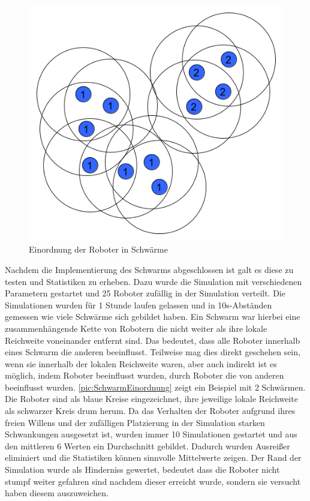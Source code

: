 \begin{figure}
	\includegraphics[width=\pictureWidth,keepaspectratio]{graphics/SchwarmEinordnung.png}
	\caption{Einordnung der Roboter in Schwärme}
	\label{pic:SchwarmEinordnung}
\end{figure}

Nachdem die Implementierung des Schwarms abgeschlossen ist galt es diese zu testen und Statistiken zu erheben. Dazu wurde die Simulation mit verschiedenen Parametern gestartet und 25 Roboter zufällig in der Simulation verteilt. Die Simulationen wurden für 1 Stunde laufen gelassen und in 10s-Abständen gemessen wie viele Schwärme sich gebildet haben.
Ein Schwarm war hierbei eine zusammenhängende Kette von Robotern die nicht weiter als ihre lokale Reichweite voneinander entfernt sind. Das bedeutet, dass alle Roboter innerhalb eines Schwarm die anderen beeinflusst. Teilweise mag dies direkt geschehen sein, wenn sie innerhalb der lokalen Reichweite waren, aber auch indirekt ist es möglich, indem Roboter beeinflusst wurden, durch Roboter die von anderen beeinflusst wurden. \autoref{pic:SchwarmEinordnung} zeigt ein Beispiel mit 2 Schwärmen. Die Roboter sind als blaue Kreise eingezeichnet, ihre jeweilige lokale Reichweite als schwarzer Kreis drum herum.
Da das Verhalten der Roboter aufgrund ihres freien Willens und der zufälligen Platzierung in der Simulation starken Schwankungen ausgesetzt ist, wurden immer 10 Simulationen gestartet und aus den mittleren 6 Werten ein Durchschnitt gebildet. Dadurch wurden Ausreißer eliminiert und die Statistiken können sinnvolle Mittelwerte zeigen. Der Rand der Simulation wurde als Hinderniss gewertet, bedeutet dass die Roboter nicht stumpf weiter gefahren sind nachdem dieser erreicht wurde, sondern sie versucht haben diesem auszuweichen.

